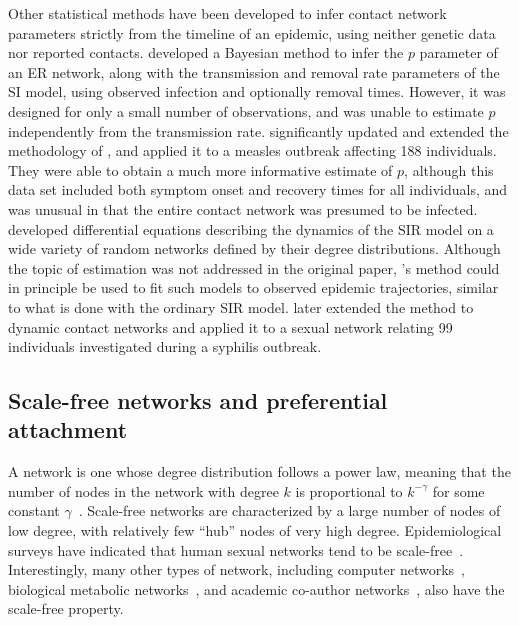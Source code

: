 Other statistical methods have been developed to infer contact network
parameters strictly from the timeline of an epidemic, using neither genetic
data nor reported contacts. \textcite{britton2002bayesian} developed a Bayesian
method to infer the $p$ parameter of an \gls{ER} network, along with the
transmission and removal rate parameters of the \gls{SI} model, using observed
infection and optionally removal times. However, it was designed for only a
small number of observations, and was unable to estimate $p$ independently from
the transmission rate.  \textcite{groendyke2011bayesian} significantly updated
and extended the methodology of \citeauthor{britton2002bayesian}, and applied
it to a measles outbreak affecting 188 individuals. They were able to obtain a
much more informative estimate of $p$, although this data set included both
symptom onset and recovery times for all individuals, and was unusual in that
the entire contact network was presumed to be infected. \textcite{volz2008sir}
developed differential equations describing the dynamics of the \gls{SIR} model
on a wide variety of random networks defined by their degree distributions.
Although the topic of estimation was not addressed in the original paper,
\citeauthor{volz2008sir}'s method could in principle be used to fit such models
to observed epidemic trajectories, similar to what is done with the ordinary
\gls{SIR} model. \textcite{volz2007susceptible} later extended the method to
dynamic contact networks and applied it to a sexual network relating 99
individuals investigated during a syphilis outbreak.

\subsection{Scale-free networks and preferential attachment}
\label{subsec:pa}

A  network is one whose degree distribution follows a power
law, meaning that the number of nodes in the network with degree $k$ is
proportional to $k^{-\gamma}$ for some constant
$\gamma$~\autocite{barabasi1999emergence}. Scale-free networks are
characterized by a large number of nodes of low degree, with relatively few
``hub'' nodes of very high degree. Epidemiological surveys have indicated that
human sexual networks tend to be scale-free~\autocite{liljeros2001web,
schneeberger2004scale, colgate1989risk}. Interestingly, many other types of
network, including computer networks~\autocite{pastor2001epidemic}, biological
metabolic networks~\autocite{jeong2000large}, and academic co-author
networks~\autocite{barabasi2002evolution}, also have the scale-free property.

